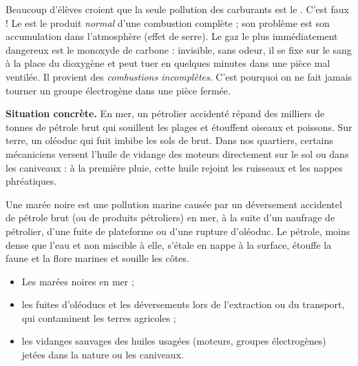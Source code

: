 \documentclass[11pt]{article}
\newcommand{\cle}[1]{{\popxbold\color{popdark}#1}}
\newcounter{popsec}
\newcounter{popsub}
\newcommand{\courssub}[1]{%
  \stepcounter{popsub}%
  \par\vspace{9pt}\noindent{\popxbold\fontsize{11.5}{13}\selectfont\color{popink}{\color{poporange}\thepopsec.\thepopsub}\hspace{6pt}#1}\par\nopagebreak\vspace{4pt}
}
\begin{document}
\begin{attention}
Beaucoup d'élèves croient que la seule pollution des carburants est le . C'est faux ! Le  est le produit \emph{normal} d'une combustion complète ; son problème est son accumulation dans l'atmosphère (effet de serre). Le gaz le plus immédiatement dangereux est le \cle{monoxyde de carbone}  : invisible, sans odeur, il se fixe sur le sang à la place du dioxygène et peut tuer en quelques minutes dans une pièce mal ventilée. Il provient des \emph{combustions incomplètes}. C'est pourquoi on ne fait jamais tourner un groupe électrogène dans une pièce fermée.
\end{attention}

\courssub{La pollution des sols et des eaux}

\textbf{Situation concrète.} En mer, un pétrolier accidenté répand des milliers de tonnes de pétrole brut qui souillent les plages et étouffent oiseaux et poissons. Sur terre, un oléoduc qui fuit imbibe les sols de brut. Dans nos quartiers, certains mécaniciens versent l'huile de vidange des moteurs directement sur le sol ou dans les caniveaux : à la première pluie, cette huile rejoint les ruisseaux et les nappes phréatiques.

\begin{definition}
Une \cle{marée noire} est une pollution marine causée par un déversement accidentel de pétrole brut (ou de produits pétroliers) en mer, à la suite d'un naufrage de pétrolier, d'une fuite de plateforme ou d'une rupture d'oléoduc. Le pétrole, moins dense que l'eau et non miscible à elle, s'étale en nappe à la surface, étouffe la faune et la flore marines et souille les côtes.
\end{definition}

\begin{aretenir}
\begin{itemize}
\item Les \cle{marées noires} en mer ;
\item les \cle{fuites d'oléoducs} et les déversements lors de l'extraction ou du transport, qui contaminent les terres agricoles ;
\item les \cle{vidanges sauvages} des huiles usagées (moteurs, groupes électrogènes) jetées dans la nature ou les caniveaux.
\end{itemize}
\end{aretenir}
\end{document}
